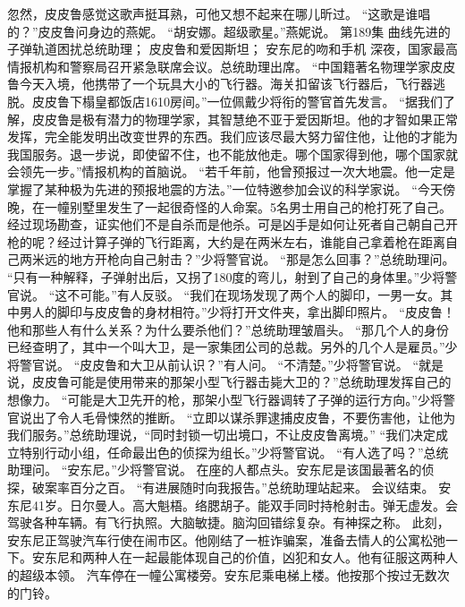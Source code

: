 \documentclass[a4paper,12pt,UTF8,twoside]{ctexbook}
\begin{document}
        忽然，皮皮鲁感觉这歌声挺耳熟，可他又想不起来在哪儿昕过。 
        “这歌是谁唱的？”皮皮鲁问身边的燕妮。 
        “胡安娜。超级歌星。”燕妮说。   第189集 
        曲线先进的子弹轨道困扰总统助理； 
        皮皮鲁和爱因斯坦； 
        安东尼的吻和手机   
        深夜，国家最高情报机构和警察局召开紧急联席会议。总统助理出席。 
        “中国籍著名物理学家皮皮鲁今天入境，他携带了一个玩具大小的飞行器。海关扣留该飞行器后，飞行器逃脱。皮皮鲁下榻皇都饭店1610房间。”一位佩戴少将衔的警官首先发言。 
        “据我们了解，皮皮鲁是极有潜力的物理学家，其智慧绝不亚于爱因斯坦。他的才智如果正常发挥，完全能发明出改变世界的东西。我们应该尽最大努力留住他，让他的才能为我国服务。退一步说，即使留不住，也不能放他走。哪个国家得到他，哪个国家就会领先一步。”情报机构的首脑说。 
        “若千年前，他曾预报过一次大地震。他一定是掌握了某种极为先进的预报地震的方法。”一位特邀参加会议的科学家说。 
        “今天傍晚，在一幢别墅里发生了一起很奇怪的人命案。5名男士用自己的枪打死了自己。经过现场勘查，证实他们不是自杀而是他杀。可是凶手是如何让死者自己朝自己开枪的呢？经过计算子弹的飞行距离，大约是在两米左右，谁能自己拿着枪在距离自己两米远的地方开枪向自己射击？”少将警官说。 
        “那是怎么回事？”总统助理问。 
        “只有一种解释，子弹射出后，又拐了180度的弯儿，射到了自己的身体里。”少将警官说。 
        “这不可能。”有人反驳。 
        “我们在现场发现了两个人的脚印，一男一女。其中男人的脚印与皮皮鲁的身材相符。”少将打开文件夹，拿出脚印照片。 
        “皮皮鲁！他和那些人有什么关系？为什么要杀他们？”总统助理皱眉头。 
        “那几个人的身份已经查明了，其中一个叫大卫，是一家集团公司的总裁。另外的几个人是雇员。”少将警官说。 
        “皮皮鲁和大卫从前认识？”有人问。 
        “不清楚。”少将警官说。 
        “就是说，皮皮鲁可能是使用带来的那架小型飞行器击毙大卫的？”总统助理发挥自己的想像力。 
        “可能是大卫先开的枪，那架小型飞行器调转了子弹的运行方向。”少将警官说出了令人毛骨悚然的推断。 
        “立即以谋杀罪逮捕皮皮鲁，不要伤害他，让他为我们服务。”总统助理说，“同时封锁一切出境口，不让皮皮鲁离境。” 
        “我们决定成立特别行动小组，任命最出色的侦探为组长。”少将警官说。 
        “有人选了吗？”总统助理问。 
        “安东尼。”少将警官说。 
        在座的人都点头。安东尼是该国最著名的侦探，破案率百分之百。 
        “有进展随时向我报告。”总统助理站起来。 
        会议结束。 
        安东尼41岁。日尔曼人。高大魁梧。络腮胡子。能双手同时持枪射击。弹无虚发。会驾驶各种车辆。有飞行执照。大脑敏捷。脑沟回错综复杂。有神探之称。 
        此刻，安东尼正驾驶汽车行使在闹市区。他刚结了一桩诈骗案，准备去情人的公寓松弛一下。安东尼和两种人在一起最能体现自己的价值，凶犯和女人。他有征服这两种人的超级本领。 
        汽车停在一幢公寓楼旁。安东尼乘电梯上楼。他按那个按过无数次的门铃。 
\end{document}
